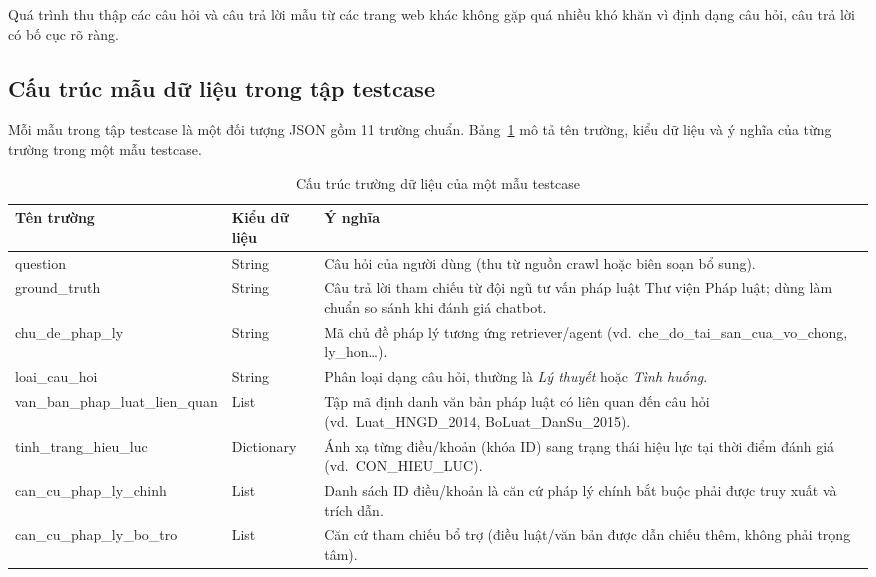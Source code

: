 \documentclass[../DoAn.tex]{subfiles}
\begin{document}
Quá trình thu thập các câu hỏi và câu trả lời mẫu từ các trang web khác không gặp quá nhiều khó khăn vì định dạng câu hỏi, câu trả lời có bố cục rõ ràng.

\subsection{Cấu trúc mẫu dữ liệu trong tập testcase}

Mỗi mẫu trong tập testcase là một đối tượng JSON gồm 11 trường chuẩn. Bảng~\ref{tab:testcase_schema} mô tả tên trường, kiểu dữ liệu và ý nghĩa của từng trường trong một mẫu testcase.

\begin{table}[H]
\centering
\footnotesize
\caption{Cấu trúc trường dữ liệu của một mẫu testcase}
\label{tab:testcase_schema}
\begin{tabularx}{\textwidth}{|>{\raggedright\arraybackslash}p{4.4cm}|>{\raggedright\arraybackslash}p{2.0cm}|>{\raggedright\arraybackslash}X|}
\hline
\textbf{Tên trường} & \textbf{Kiểu dữ liệu} & \textbf{Ý nghĩa} \\
\hline
question & String & Câu hỏi của người dùng (thu từ nguồn crawl hoặc biên soạn bổ sung). \\
\hline
ground\_\allowbreak truth & String & Câu trả lời tham chiếu từ đội ngũ tư vấn pháp luật Thư viện Pháp luật; dùng làm chuẩn so sánh khi đánh giá chatbot. \\
\hline
chu\_\allowbreak de\_\allowbreak phap\_\allowbreak ly & String & Mã chủ đề pháp lý tương ứng retriever/agent (vd.\ che\_do\_tai\_san\_cua\_vo\_chong, ly\_hon\ldots). \\
\hline
loai\_\allowbreak cau\_\allowbreak hoi & String & Phân loại dạng câu hỏi, thường là \textit{Lý thuyết} hoặc \textit{Tình huống}. \\
\hline
van\_\allowbreak ban\_\allowbreak phap\_\allowbreak luat\_\allowbreak lien\_\allowbreak quan & List & Tập mã định danh văn bản pháp luật có liên quan đến câu hỏi (vd.\ Luat\_HNGD\_2014, BoLuat\_DanSu\_2015). \\
\hline
tinh\_\allowbreak trang\_\allowbreak hieu\_\allowbreak luc & Dictionary & Ánh xạ từng điều/khoản (khóa ID) sang trạng thái hiệu lực tại thời điểm đánh giá (vd.\ CON\_HIEU\_LUC). \\
\hline
can\_\allowbreak cu\_\allowbreak phap\_\allowbreak ly\_\allowbreak chinh & List & Danh sách ID điều/khoản là căn cứ pháp lý chính bắt buộc phải được truy xuất và trích dẫn. \\
\hline
can\_\allowbreak cu\_\allowbreak phap\_\allowbreak ly\_\allowbreak bo\_\allowbreak tro & List & Căn cứ tham chiếu bổ trợ (điều luật/văn bản được dẫn chiếu thêm, không phải trọng tâm). \\

\end{tabularx}
\end{table}
\end{document}
